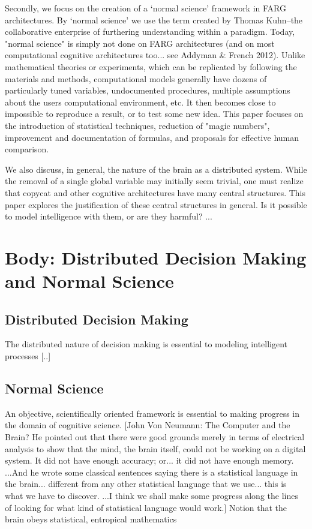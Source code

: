 \documentclass[a4paper]{article}
\begin{document}
    Secondly, we focus on the creation of a `normal science' framework in FARG architectures. 
    By `normal science' we use the term created by Thomas Kuhn--the collaborative enterprise of furthering understanding within a paradigm. 
    Today, "normal science" is simply not done on FARG architectures (and on most computational cognitive architectures too... see Addyman \& French 2012). 
    Unlike mathematical theories or experiments, which can be replicated by following the materials and methods, computational models generally have dozens of particularly tuned variables, undocumented procedures, multiple assumptions about the users computational environment, etc. 
    It then becomes close to impossible to reproduce a result, or to test some new idea. 
    This paper focuses on the introduction of statistical techniques, reduction of "magic numbers", improvement and documentation of formulas, and proposals for effective human comparison.

    We also discuss, in general, the nature of the brain as a distributed system.
    While the removal of a single global variable may initially seem trivial, one must realize that copycat and other cognitive architectures have many central structures.
    This paper explores the justification of these central structures in general.
    Is it possible to model intelligence with them, or are they harmful?
    ...

\section{Body: Distributed Decision Making and Normal Science}

\subsection{Distributed Decision Making}

    The distributed nature of decision making is essential to modeling intelligent processes [..]

\subsection{Normal Science}

    An objective, scientifically oriented framework is essential to making progress in the domain of cognitive science.
    [John Von Neumann: The Computer and the Brain?
    He pointed out that there were good grounds merely in terms of electrical analysis to show that the mind, the brain itself, could not be working on a digital system. It did not have enough accuracy; or... it did not have enough memory. ...And he wrote some classical sentences saying there is a statistical language in the brain... different from any other statistical language that we use... this is what we have to discover. ...I think we shall make some progress along the lines of looking for what kind of statistical language would work.]
    Notion that the brain obeys statistical, entropical mathematics
\end{document}
